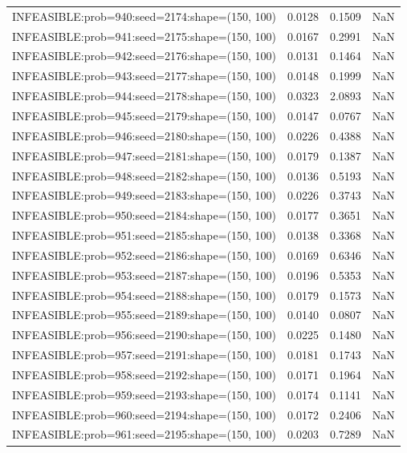 \begin{longtable}{lccc}
INFEASIBLE:prob=940:seed=2174:shape=(150, 100) &   0.0128 &  0.1509 &    NaN \\
INFEASIBLE:prob=941:seed=2175:shape=(150, 100) &   0.0167 &  0.2991 &    NaN \\
INFEASIBLE:prob=942:seed=2176:shape=(150, 100) &   0.0131 &  0.1464 &    NaN \\
INFEASIBLE:prob=943:seed=2177:shape=(150, 100) &   0.0148 &  0.1999 &    NaN \\
INFEASIBLE:prob=944:seed=2178:shape=(150, 100) &   0.0323 &  2.0893 &    NaN \\
INFEASIBLE:prob=945:seed=2179:shape=(150, 100) &   0.0147 &  0.0767 &    NaN \\
INFEASIBLE:prob=946:seed=2180:shape=(150, 100) &   0.0226 &  0.4388 &    NaN \\
INFEASIBLE:prob=947:seed=2181:shape=(150, 100) &   0.0179 &  0.1387 &    NaN \\
INFEASIBLE:prob=948:seed=2182:shape=(150, 100) &   0.0136 &  0.5193 &    NaN \\
INFEASIBLE:prob=949:seed=2183:shape=(150, 100) &   0.0226 &  0.3743 &    NaN \\
INFEASIBLE:prob=950:seed=2184:shape=(150, 100) &   0.0177 &  0.3651 &    NaN \\
INFEASIBLE:prob=951:seed=2185:shape=(150, 100) &   0.0138 &  0.3368 &    NaN \\
INFEASIBLE:prob=952:seed=2186:shape=(150, 100) &   0.0169 &  0.6346 &    NaN \\
INFEASIBLE:prob=953:seed=2187:shape=(150, 100) &   0.0196 &  0.5353 &    NaN \\
INFEASIBLE:prob=954:seed=2188:shape=(150, 100) &   0.0179 &  0.1573 &    NaN \\
INFEASIBLE:prob=955:seed=2189:shape=(150, 100) &   0.0140 &  0.0807 &    NaN \\
INFEASIBLE:prob=956:seed=2190:shape=(150, 100) &   0.0225 &  0.1480 &    NaN \\
INFEASIBLE:prob=957:seed=2191:shape=(150, 100) &   0.0181 &  0.1743 &    NaN \\
INFEASIBLE:prob=958:seed=2192:shape=(150, 100) &   0.0171 &  0.1964 &    NaN \\
INFEASIBLE:prob=959:seed=2193:shape=(150, 100) &   0.0174 &  0.1141 &    NaN \\
INFEASIBLE:prob=960:seed=2194:shape=(150, 100) &   0.0172 &  0.2406 &    NaN \\
INFEASIBLE:prob=961:seed=2195:shape=(150, 100) &   0.0203 &  0.7289 &    NaN \\

\end{longtable}

